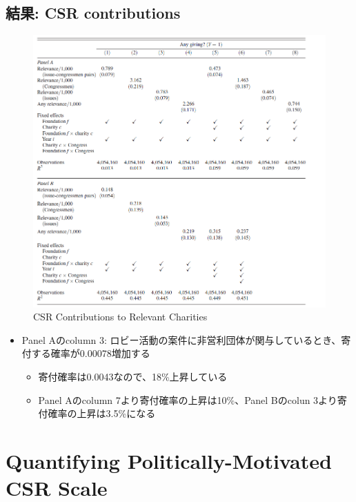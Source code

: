 \documentclass[../root]{subfiles}
\begin{document}
    \subsection{結果: CSR contributions}\label{ux7d50ux679c-csr-contributions}

    \begin{figure}
    \centering
    \includegraphics[width = .8\linewidth]{0911kato/92614724-57141800-f2f7-11ea-8d26-69fcdf3894a7.png}
    \caption{CSR Contributions to Relevant Charities}
    \end{figure}

    \begin{itemize}
    
    \item
      Panel Aのcolumn 3: ロビー活動の案件に非営利団体が関与しているとき、寄付する確率が0.00078増加する

      \begin{itemize}
      
      \item
        寄付確率は0.0043なので、18\%上昇している
      \item
        Panel Aのcolumn 7より寄付確率の上昇は10\%、Panel Bのcolun 3より寄付確率の上昇は3.5\%になる
      \end{itemize}
    \end{itemize}

    \section{Quantifying Politically-Motivated CSR Scale}\label{quantifying-politically-motivated-csr-scale}
\end{document}
